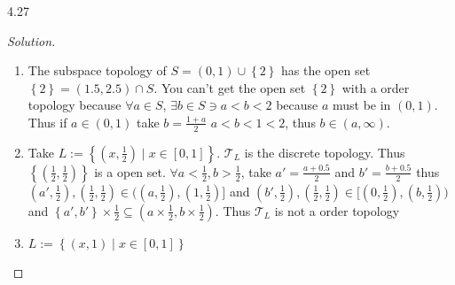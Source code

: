 \documentclass{article}
\newcommand*{\T}{\mathcal{T}}
\newenvironment{solution}
{\renewcommand\qedsymbol{$\blacksquare$}\begin{proof}[Solution]}
{\end{proof}}
\begin{document}
\begin{PROB}{4.27}\label{Problem 4.27.}
\end{PROB}
\begin{solution}
    \begin{enumerate}
        \item The subspace topology of $S = (0, 1) \cup \left\{ 2 \right\}$ has the open set $\left\{ 2 \right\} = (1.5, 2.5) \cap S$. You can't get the open set $\left\{ 2 \right\}$ with a order topology because $\forall a \in S$, $\exists b \in S \ni a < b < 2$ because $a$ must be in $(0, 1)$. Thus if $a \in (0, 1)$ take $b = \frac{1 + a}{2}$ $a < b < 1 < 2$, thus $b \in (a, \infty)$. 
        \item Take $L := \left\{ (x, \frac{1}{2}) \mid x \in [0, 1] \right\}$. $\T_L$ is the discrete topology. Thus $\left\{ (\frac{1}{2}, \frac{1}{2}) \right\}$ is a open set. $\forall a < \frac{1}{2}, b > \frac{1}{2}$, take $a' = \frac{a + 0.5}{2}$ and $b' = \frac{b + 0.5}{2}$ thus $(a', \frac{1}{2}), (\frac{1}{2}, \frac{1}{2}) \in ((a, \frac{1}{2}), (1, \frac{1}{2})]$ and $(b', \frac{1}{2}), (\frac{1}{2}, \frac{1}{2}) \in [(0, \frac{1}{2}), (b, \frac{1}{2}))$ and $\left\{ a', b' \right\} \times {\frac{1}{2}} \subseteq (a \times \frac{1}{2}, b \times \frac{1}{2})$. Thus $\T_L$ is not a order topology
        \item $L := \left\{ (x, 1) \mid x \in [0, 1] \right\}$ 
    \end{enumerate}
\end{solution}

\bigskip
\end{document}

